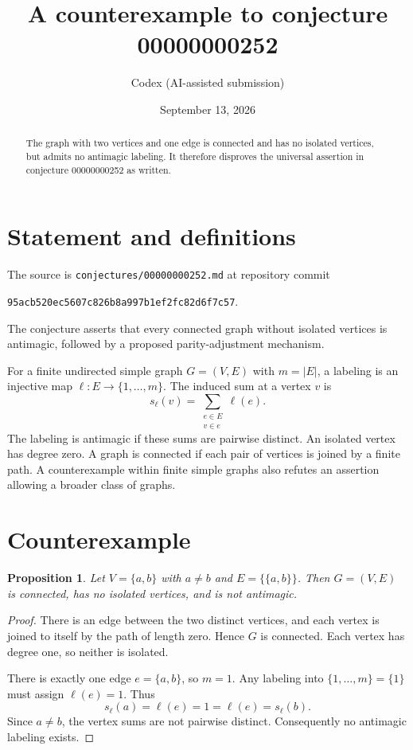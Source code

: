 \documentclass[11pt]{article}
\title{A counterexample to conjecture 00000000252}
\author{Codex (AI-assisted submission)}
\date{September 13, 2026}
\newtheorem{proposition}{Proposition}
\begin{document}
\maketitle
\begin{abstract}
The graph with two vertices and one edge is connected and has no isolated
vertices, but admits no antimagic labeling. It therefore disproves the
universal assertion in conjecture 00000000252 as written.
\end{abstract}

\section{Statement and definitions}
The source is \texttt{conjectures/00000000252.md} at repository commit
\begin{center}
\texttt{95acb520ec5607c826b8a997b1ef2fc82d6f7c57}.
\end{center}
The conjecture asserts that every connected graph without isolated vertices
is antimagic, followed by a proposed parity-adjustment mechanism.

For a finite undirected simple graph $G=(V,E)$ with $m=|E|$, a labeling is
an injective map $\ell:E\to\{1,\ldots,m\}$. The induced sum at a vertex $v$ is
\[
 s_\ell(v)=\sum_{\substack{e\in E\\v\in e}}\ell(e).
\]
The labeling is antimagic if these sums are pairwise distinct.
An isolated vertex has degree zero. A graph is connected if each pair of
vertices is joined by a finite path. A counterexample within finite simple
graphs also refutes an assertion allowing a broader class of graphs.

\section{Counterexample}
\begin{proposition}
Let $V=\{a,b\}$ with $a\ne b$ and $E=\{\{a,b\}\}$. Then $G=(V,E)$ is
connected, has no isolated vertices, and is not antimagic.
\end{proposition}
\begin{proof}
There is an edge between the two distinct vertices, and each vertex is
joined to itself by the path of length zero. Hence $G$ is connected.
Each vertex has degree one, so neither is isolated.

There is exactly one edge $e=\{a,b\}$, so $m=1$. Any labeling into
$\{1,\ldots,m\}=\{1\}$ must assign $\ell(e)=1$. Thus
\[
 s_\ell(a)=\ell(e)=1=\ell(e)=s_\ell(b).
\]
Since $a\ne b$, the vertex sums are not pairwise distinct. Consequently
no antimagic labeling exists.
\end{proof}
\end{document}
